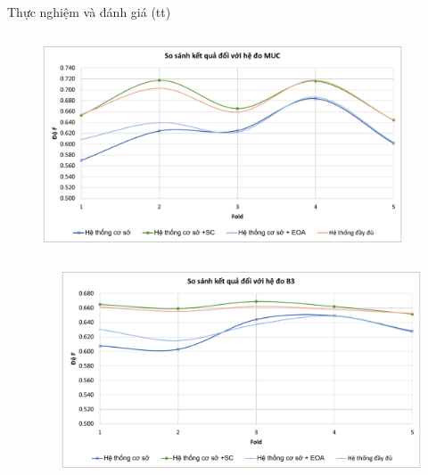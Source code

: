 \documentclass[9pt,xcolor=table]{beamer}
\begin{document}
		\begin{frame}[t]{Thực nghiệm và đánh giá (tt)}								
			\begin{columns}[t]
				\begin{column}{0.6\textwidth}					
					\begin{figure}[H] 			
						\centering					
						\includegraphics[scale=0.35]{charts/chart_muc.pdf}											
					\end{figure} 				
				\end{column}
				\begin{column}{0.4\textwidth}
				\end{column}
			\end{columns}
			\begin{columns}[t]
				\begin{column}{0.4\textwidth}
				\end{column}
				\begin{column}{0.6\textwidth}
					\begin{figure}[H] 
						\centering					
						\includegraphics[scale=0.35]{charts/chart_b3.pdf}					
					\end{figure}
				\end{column}				
			\end{columns}						
		\end{frame}
\end{document}
